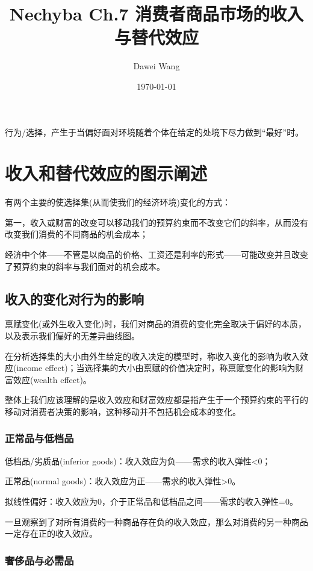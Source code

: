 \documentclass{article}
\title{Nechyba Ch.7 消费者商品市场的收入与替代效应}
\author{Dawei Wang}
\date{\today}
\begin{document}
	\maketitle
行为/选择，产生于当偏好面对环境随着个体在给定的处境下尽力做到“最好”时。

\section{收入和替代效应的图示阐述}
有两个主要的使选择集(从而使我们的经济环境)变化的方式：

第一，收入或财富的改变可以移动我们的预算约束而不改变它们的斜率，从而没有改变我们消费的不同商品的机会成本；

经济中个体——不管是以商品的价格、工资还是利率的形式——可能改变并且改变了预算约束的斜率与我们面对的机会成本。

\subsection{收入的变化对行为的影响}
禀赋变化(或外生收入变化)时，我们对商品的消费的变化完全取决于偏好的本质，以及表示我们偏好的无差异曲线图。

在分析选择集的大小由外生给定的收入决定的模型时，称收入变化的影响为收入效应(income effect)；当选择集的大小由禀赋的价值决定时，称禀赋变化的影响为财富效应(wealth effect)。

整体上我们应该理解的是收入效应和财富效应都是指产生于一个预算约束的平行的移动对消费者决策的影响，这种移动并不包括机会成本的变化。

\subsubsection{正常品与低档品}

低档品/劣质品(inferior goods)：收入效应为负——需求的收入弹性<0；

正常品(normal goods)：收入效应为正——需求的收入弹性>0。

拟线性偏好：收入效应为0，介于正常品和低档品之间——需求的收入弹性=0。

\hspace*{\fill}

一旦观察到了对所有消费的一种商品存在负的收入效应，那么对消费的另一种商品一定存在正的收入效应。

\subsubsection{奢侈品与必需品}
\end{document}
